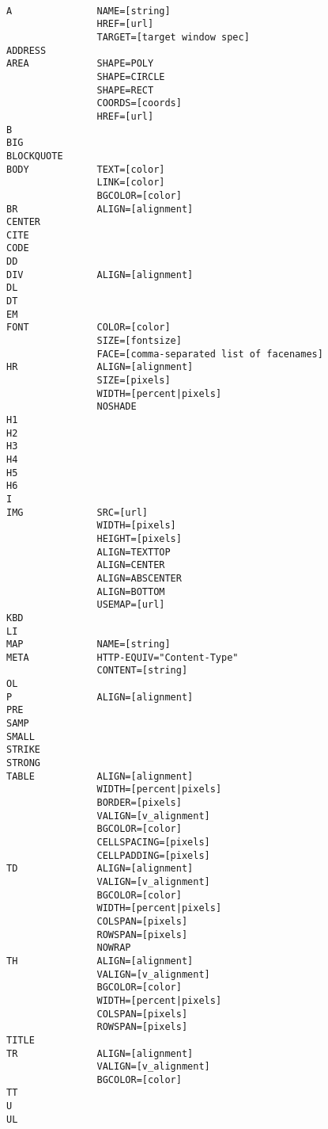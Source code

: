 \begin{verbatim}

A               NAME=[string]
                HREF=[url]
                TARGET=[target window spec]
ADDRESS
AREA            SHAPE=POLY
                SHAPE=CIRCLE
                SHAPE=RECT
                COORDS=[coords]
                HREF=[url]
B
BIG
BLOCKQUOTE
BODY            TEXT=[color]
                LINK=[color]
                BGCOLOR=[color]
BR              ALIGN=[alignment]
CENTER
CITE
CODE
DD
DIV             ALIGN=[alignment]
DL
DT
EM
FONT            COLOR=[color]
                SIZE=[fontsize]
                FACE=[comma-separated list of facenames]
HR              ALIGN=[alignment]
                SIZE=[pixels]
                WIDTH=[percent|pixels]
                NOSHADE
H1
H2
H3
H4
H5
H6
I
IMG             SRC=[url]
                WIDTH=[pixels]
                HEIGHT=[pixels]
                ALIGN=TEXTTOP
                ALIGN=CENTER
                ALIGN=ABSCENTER
                ALIGN=BOTTOM
                USEMAP=[url]
KBD
LI
MAP             NAME=[string]
META            HTTP-EQUIV="Content-Type"
                CONTENT=[string]
OL
P               ALIGN=[alignment]
PRE
SAMP
SMALL
STRIKE
STRONG
TABLE           ALIGN=[alignment]
                WIDTH=[percent|pixels]
                BORDER=[pixels]
                VALIGN=[v_alignment]
                BGCOLOR=[color]
                CELLSPACING=[pixels]
                CELLPADDING=[pixels]
TD              ALIGN=[alignment]
                VALIGN=[v_alignment]
                BGCOLOR=[color]
                WIDTH=[percent|pixels]
                COLSPAN=[pixels]
                ROWSPAN=[pixels]
                NOWRAP
TH              ALIGN=[alignment]
                VALIGN=[v_alignment]
                BGCOLOR=[color]
                WIDTH=[percent|pixels]
                COLSPAN=[pixels]
                ROWSPAN=[pixels]
TITLE
TR              ALIGN=[alignment]
                VALIGN=[v_alignment]
                BGCOLOR=[color]
TT
U
UL

\end{verbatim}

